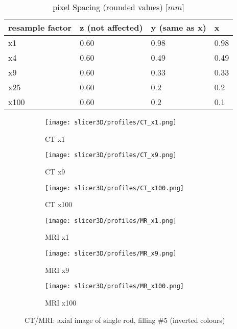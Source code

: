 \begin{table}[!htb]
\centering
\begin{tabular}{l|l|l|l}
resample factor  & z (not affected) &  y (same as x) & x \\
\toprule
x1     & 0.60 & 0.98	& 0.98	\\
x4     & 0.60 & 0.49	& 0.49	\\
x9     & 0.60 & 0.33	& 0.33	\\
x25    & 0.60 & 0.2 	& 0.2	\\
x100   & 0.60 & 0.2 	& 0.1
\end{tabular}
\caption{pixel Spacing (rounded values) [$mm$]}
\label{tab:spacing}
\end{table}


\begin{figure}[!thb]
  \begin{subfigure}[b]{0.32\textwidth}
    \texttt{[image: slicer3D/profiles/CT\_x1.png]}
    \caption{CT x1}
    \label{fig:CT_x1}
  \end{subfigure}
  \hfill
  \begin{subfigure}[b]{0.32\textwidth}
    \texttt{[image: slicer3D/profiles/CT\_x9.png]}
    \caption{CT x9}
    \label{fig:CT_x9}
  \end{subfigure}
    \hfill
  \begin{subfigure}[b]{0.32\textwidth}
    \texttt{[image: slicer3D/profiles/CT\_x100.png]}
    \caption{CT x100}
    \label{fig:CT_x100}
  \end{subfigure}
  \begin{subfigure}[b]{0.32\textwidth}
    \texttt{[image: slicer3D/profiles/MR\_x1.png]}
    \caption{MRI x1}
    \label{fig:MRI_x1}
  \end{subfigure}
  \hfill
  \begin{subfigure}[b]{0.32\textwidth}
    \texttt{[image: slicer3D/profiles/MR\_x9.png]}
    \caption{MRI x9}
    \label{fig:MRI_x9}
  \end{subfigure}
    \hfill
  \begin{subfigure}[b]{0.32\textwidth}
    \texttt{[image: slicer3D/profiles/MR\_x100.png]}
    \caption{MRI x100}
    \label{fig:MRI_x100}
  \end{subfigure}
  \caption{CT/MRI: axial image of single rod, filling \#5  (inverted colours)}
  \label{fig:resample}
\end{figure}
\clearpage



